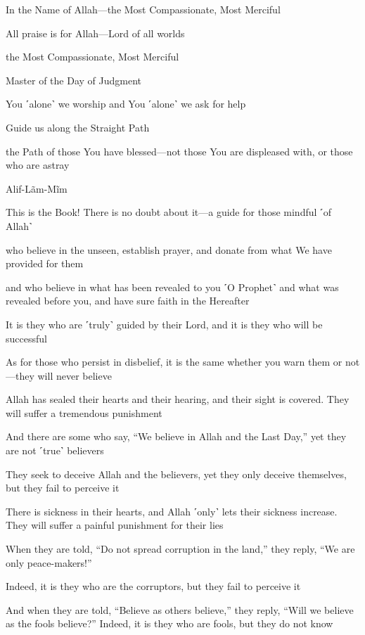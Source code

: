 In the Name of Allah—the Most Compassionate, Most Merciful

All praise is for Allah—Lord of all worlds

the Most Compassionate, Most Merciful

Master of the Day of Judgment

You ˹alone˺ we worship and You ˹alone˺ we ask for help

Guide us along the Straight Path

the Path of those You have blessed—not those You are displeased with, or those who are astray

Alif-Lãm-Mĩm

This is the Book! There is no doubt about it—a guide for those mindful ˹of Allah˺

who believe in the unseen, establish prayer, and donate from what We have provided for them

and who believe in what has been revealed to you ˹O Prophet˺ and what was revealed before you, and have sure faith in the Hereafter

It is they who are ˹truly˺ guided by their Lord, and it is they who will be successful

As for those who persist in disbelief, it is the same whether you warn them or not—they will never believe

Allah has sealed their hearts and their hearing, and their sight is covered. They will suffer a tremendous punishment

And there are some who say, “We believe in Allah and the Last Day,” yet they are not ˹true˺ believers

They seek to deceive Allah and the believers, yet they only deceive themselves, but they fail to perceive it

There is sickness in their hearts, and Allah ˹only˺ lets their sickness increase. They will suffer a painful punishment for their lies

When they are told, “Do not spread corruption in the land,” they reply, “We are only peace-makers!”

Indeed, it is they who are the corruptors, but they fail to perceive it

And when they are told, “Believe as others believe,” they reply, “Will we believe as the fools believe?” Indeed, it is they who are fools, but they do not know

